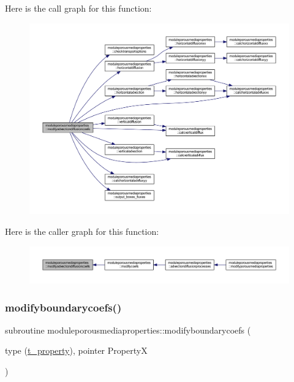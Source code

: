 Here is the call graph for this function\+:\nopagebreak
\begin{figure}[H]
\begin{center}
\leavevmode
\includegraphics[width=350pt]{namespacemoduleporousmediaproperties_aaeea83f4ec370391b45509fd7863a3bc_cgraph}
\end{center}
\end{figure}
Here is the caller graph for this function\+:\nopagebreak
\begin{figure}[H]
\begin{center}
\leavevmode
\includegraphics[width=350pt]{namespacemoduleporousmediaproperties_aaeea83f4ec370391b45509fd7863a3bc_icgraph}
\end{center}
\end{figure}
\mbox{\label{namespacemoduleporousmediaproperties_a4a088b65d745be5c1c555008b706cf6a}} 
\subsubsection{\texorpdfstring{modifyboundarycoefs()}{modifyboundarycoefs()}}
{\footnotesize\ttfamily subroutine moduleporousmediaproperties\+::modifyboundarycoefs (\begin{DoxyParamCaption}\item[{type (\mbox{\hyperlink{structmoduleporousmediaproperties_1_1t__property}{t\+\_\+property}}), pointer}]{PropertyX }\end{DoxyParamCaption})\hspace{0.3cm}{\ttfamily [private]}}

